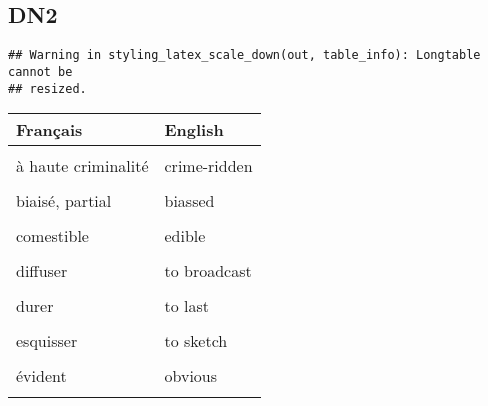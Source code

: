 \documentclass[
  10pt,
]{article}
\begin{document}
\hypertarget{dn2}{%
\subsection{DN2}\label{dn2}}

\begin{verbatim}
## Warning in styling_latex_scale_down(out, table_info): Longtable cannot be
## resized.
\end{verbatim}

\begin{longtable}{ll}
\toprule
Français & English\\
\midrule
\cellcolor{gray!6}{aborder (un sujet)} & \cellcolor{gray!6}{to tackle}\\

à haute criminalité & crime-ridden\\

\cellcolor{gray!6}{attendre de qn que...} & \cellcolor{gray!6}{to expect sb to}\\

biaisé, partial & biassed\\

\cellcolor{gray!6}{chaos} & \cellcolor{gray!6}{mayhem}\\

comestible & edible\\

\cellcolor{gray!6}{destinataire, récipiendaire} & \cellcolor{gray!6}{a recipient}\\

diffuser & to broadcast\\

\cellcolor{gray!6}{disposer, agencer} & \cellcolor{gray!6}{to lay out}\\

durer & to last\\

\cellcolor{gray!6}{échapper à} & \cellcolor{gray!6}{to elude}\\

esquisser & to sketch\\

\cellcolor{gray!6}{être susceptible de} & \cellcolor{gray!6}{to be likely to}\\

évident & obvious\\

\cellcolor{gray!6}{exact, précis} & \cellcolor{gray!6}{accurate}\\


\end{longtable}
\end{document}
